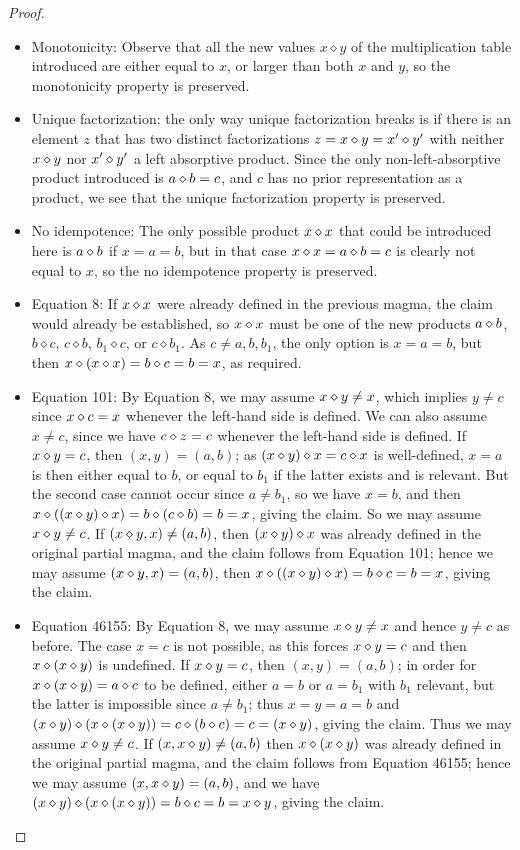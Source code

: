\begin{proof}
\begin{itemize}
  \item Monotonicity: Observe that all the new values $x \diamond y$ of the multiplication table introduced are either equal to $x$, or larger than both $x$ and $y$, so the monotonicity property is preserved.
  \item Unique factorization: the only way unique factorization breaks is if there is an element $z$ that has two distinct factorizations $z = x \diamond y = x' \diamond y'$ with neither $x \diamond y$ nor $x' \diamond y'$ a left absorptive product.  Since the only non-left-absorptive product introduced is $a \diamond b = c$, and $c$ has no prior representation as a product, we see that the unique factorization property is preserved.
  \item No idempotence: The only possible product $x \diamond x$ that could be introduced here is $a \diamond b$ if $x=a=b$, but in that case $x \diamond x = a \diamond b = c$ is clearly not equal to $x$, so the no idempotence property is preserved.
  \item Equation 8: If $x \diamond x$ were already defined in the previous magma, the claim would already be established, so $x \diamond x$ must be one of the new products $a \diamond b$, $b \diamond c$, $c \diamond b$, $b_1 \diamond c$, or $c \diamond b_1$.  As $c \neq a,b,b_1$, the only option is $x = a = b$, but then $x \diamond (x \diamond x) = b \diamond c = b = x$, as required.
  \item Equation 101: By Equation 8, we may assume $x \diamond y \neq x$, which implies $y \neq c$ since $x \diamond c = x$ whenever the left-hand side is defined.  We can also assume $x \neq c$, since we have $c \diamond z = c$ whenever the left-hand side is defined.  If $x \diamond y = c$, then $(x,y) = (a,b)$; as $(x \diamond y) \diamond x = c \diamond x$ is well-defined, $x=a$ is then either equal to $b$, or equal to $b_1$ if the latter exists and is relevant.  But the second case cannot occur since $a \neq b_1$, so we have $x = b$, and then $x \diamond ((x \diamond y) \diamond x) = b \diamond (c \diamond b) = b = x$, giving the claim.  So we may assume $x \diamond y \neq c$.  If $(x \diamond y, x) \neq (a,b)$, then $(x \diamond y) \diamond x$ was already defined in the original partial magma, and the claim follows from Equation 101; hence we may assume $(x \diamond y, x) = (a,b)$, then $x \diamond ((x \diamond y) \diamond x) = b \diamond c = b = x$, giving the claim.
  \item Equation 46155: By Equation 8, we may assume $x \diamond y \neq x$ and hence $y \neq c$ as before.  The case $x=c$ is not possible, as this forces $x \diamond y = c$ and then $x \diamond (x \diamond y)$ is undefined.  If $x \diamond y = c$, then $(x,y) = (a,b)$; in order for $x \diamond (x \diamond y) = a \diamond c$ to be defined, either $a=b$ or $a=b_1$ with $b_1$ relevant, but the latter is impossible since $a \neq b_1$; thus $x=y=a=b$ and $(x \diamond y) \diamond (x \diamond (x \diamond y)) = c \diamond (b \diamond c) = c = (x \diamond y)$, giving the claim.  Thus we may assume $x \diamond y \neq c$.  If $(x, x \diamond y) \neq (a,b)$ then $x \diamond (x \diamond y)$ was already defined in the original partial magma, and the claim follows from Equation 46155; hence we may assume $(x, x \diamond y) = (a,b)$, and we have $(x \diamond y) \diamond (x \diamond (x \diamond y)) = b \diamond c = b = x \diamond y$, giving the claim.

\end{itemize}
\end{proof}
